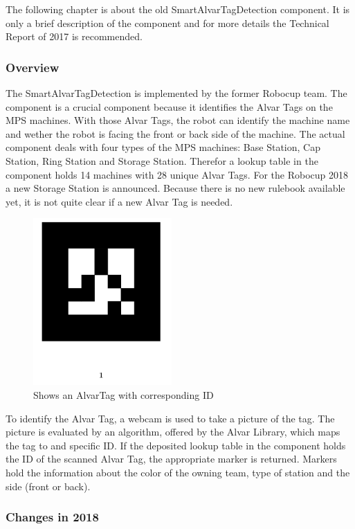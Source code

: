 The following chapter is about the old SmartAlvarTagDetection component. It is only a brief description of the component and for more details the Technical Report of 2017 is recommended. 

\subsubsection{Overview}


The SmartAlvarTagDetection is implemented by the former Robocup team. The component is a crucial component because it identifies the Alvar Tags on the MPS machines. With those Alvar Tags, the robot can identify the machine name and wether the robot is facing the front or back side of the machine. The actual component deals with four types of the MPS machines: Base Station, Cap Station, Ring Station and Storage Station. Therefor a lookup table in the component holds 14 machines with 28 unique Alvar Tags.
For the Robocup 2018 a new Storage Station is announced. Because there is no new rulebook available yet, it is not quite clear if a new Alvar Tag is needed.

\begin{figure}[h]
\centering
\includegraphics[scale=0.75]{pic/numberedMarker.png}
\caption{Shows an AlvarTag with corresponding ID}
\label{fig:smartAlvarFlow}
\end{figure}

To identify the Alvar Tag, a webcam is used to take a picture of the tag. The picture is evaluated by an algorithm, offered by the Alvar Library, which maps the tag to and specific ID. If the deposited lookup table in the component holds the ID of the scanned Alvar Tag, the appropriate marker is returned. Markers hold the information about the color of the owning team, type of station and the side (front or back). 


\subsubsection{Changes in 2018}


